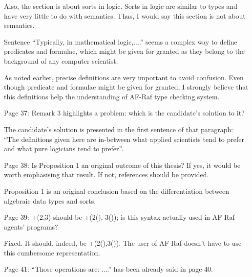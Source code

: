 \documentclass{article}
\newenvironment{them}{\noindent\begingroup\color{blue}}{\endgroup\par}
\begin{document}
Also, the section is about sorts in logic. Sorts in logic are similar to types
and have very little to do with semantics. Thus, I would say this section is
not about semantics.

\begin{them}

Sentence “Typically, in mathematical logic,....” seems a complex way to define
predicates and formulae, which might be given for granted as they belong to the
background of any computer scientist.

\end{them}
As noted earlier, precise definitions are very important to avoid confusion.
Even though predicate and formulae might be given for granted, I strongly
believe that this definitions help the understanding of AF-Raf type checking
system.

\begin{them}

Page 37:
Remark 3 highlights a problem: which is the candidate's solution to it?

\end{them}

The candidate's solution is presented in the first sentence of that paragraph:
``The definitions given here are in-between what applied scientists tend to
prefer and what pure logicians tend to prefer''.

\begin{them}

Page 38:
Is Proposition 1 an original outcome of this thesis? If yes, it would be worth
emphasising that result. If not, references should be provided.

\end{them}
Proposition 1 is an original conclusion based on the differentiation between
algebraic data types and sorts. 

\begin{them}

Page 39:
+(2,3) should be +(2(), 3()); is this syntax actually used in AF-Raf agents'
programs?

\end{them}

Fixed. It should, indeed, be +(2(),3()). The user of AF-Raf doesn't have to use
this cumbersome representation.

\begin{them}

Page 41:
“Those operations are: ....” has been already said in page 40.
\end{them}
\end{document}
